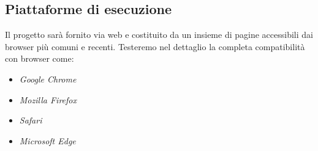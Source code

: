 \subsection{Piattaforme di esecuzione}

Il progetto sarà fornito via web e costituito da un insieme di pagine accessibili dai browser più comuni e recenti. Testeremo nel dettaglio la completa compatibilità con browser come:
\begin{itemize}
\item \textit{Google Chrome}
\item \textit{Mozilla Firefox}
\item \textit{Safari}
\item \textit{Microsoft Edge}
\end{itemize}

